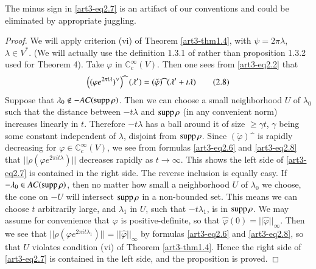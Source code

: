 \begin{remark*}
The minus sign in \eqref{art3-eq2.7} is an artifact of our conventions and could be eliminated by appropriate juggling.
\end{remark*}

\begin{proof}
We will apply criterion (vi) of Theorem \ref{art3-thm1.4}, with $\psi=2\pi \lambda$, $\lambda\in V^{*}$. (We will actually use the definition 1.3.1 of \cite{art3-D} rather than proposition 1.3.2 used for Theorem 4). Take $\varphi$ in $\mathbb{C}^{\infty}_{c}(V)$. Then one sees from \eqref{art3-eq2.2} that
\begin{equation*}
\left((\varphi e^{2\pi i\lambda})\spcheck\right)\sphat \ (\lambda')=(\check{\varphi})\sphat \ (\lambda'+t\lambda)\tag{2.8}\label{art3-eq2.8}
\end{equation*}
Suppose that $\lambda_{0}\not\in -AC(\operatorname{supp} \rho)$. Then we can choose a small neighborhood $U$ of $\lambda_{0}$ such that the distance between $-t\lambda$ and $\operatorname{supp}\rho$ (in any convenient norm) increases linearly in $t$. Therefore $-t\lambda$ has a ball around it of size $\geq \gamma t$, $\gamma$ being some constant independent of $\lambda$, disjoint from $\operatorname{supp}\rho$. Since $(\check{\varphi})\sphat$ is rapidly decreasing for $\varphi\in \mathbb{C}^{\infty}_{c}(V)$, we see from formulas \eqref{art3-eq2.6} and \eqref{art3-eq2.8} that $||\rho(\varphi e^{2\pi it\lambda})||$ decreases rapidly as $t\to \infty$. This shows the left side of \eqref{art3-eq2.7} is contained in the right side. The reverse inclusion is equally easy. If $-\lambda_{0}\in AC(\operatorname{supp} \rho)$, then no matter how small a neighborhood $U$ of $\lambda_{0}$ we choose, the cone on $-U$ will intersect $\operatorname{supp} \rho$ in a non-bounded set. This means we can choose $t$ arbitrarily large, and $\lambda_{1}$ in $U$, such that $-t\lambda_{1}$, is in $\operatorname{supp} \rho$. We may assume for convenience that $\varphi$ is positive-definite, so that $\widehat{\varphi}(0)=||\widehat{\varphi}||_{\infty}$. Then we see that $||\rho(\varphi e^{2\pi it \lambda_{1}})||=||\widehat{\varphi}||_{\infty}$ by formulas \eqref{art3-eq2.6} and \eqref{art3-eq2.8}, so that $U$ violates condition (vi) of Theorem \ref{art3-thm1.4}. Hence the right side of \eqref{art3-eq2.7} is contained in the left side, and the proposition is proved.
\end{proof}

